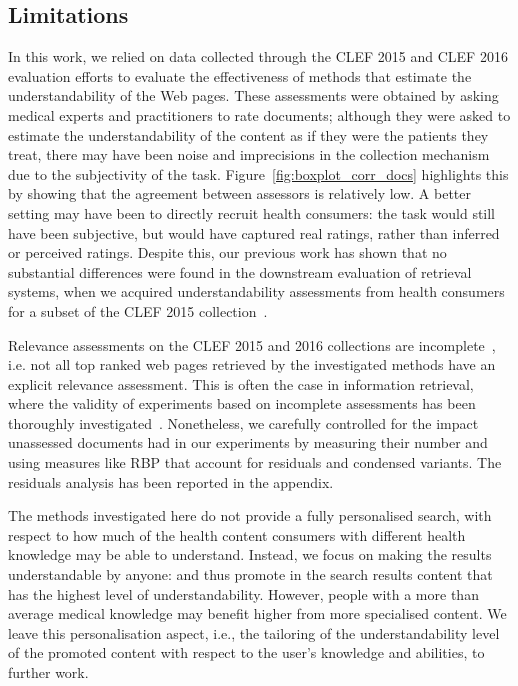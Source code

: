 \documentclass[10pt,a4paper]{article}
\begin{document}
\subsection*{Limitations}
In this work, we relied on data collected through the CLEF 2015 and CLEF 2016 evaluation efforts to evaluate the effectiveness of methods that estimate the understandability of the Web pages. These assessments were obtained by asking medical experts and practitioners to rate documents;  although they were asked to estimate the understandability of the content as if they were the patients they treat, there may have been noise and imprecisions in the collection mechanism due to the subjectivity of the
task. Figure~\ref{fig:boxplot_corr_docs} highlights this by showing that the agreement between assessors is relatively low. A better setting may have been to directly recruit health consumers: the task would still have been subjective, but would have captured real ratings, rather than inferred or perceived ratings. Despite this, our previous work has shown that no substantial differences were found in the downstream evaluation of retrieval systems, when we acquired understandability assessments from health consumers for a subset of the CLEF 2015 collection~\cite{palotti16b}. 

Relevance assessments on the CLEF 2015 and 2016 collections are incomplete~\cite{clef15,clef16}, i.e. not all top ranked web pages retrieved by the investigated methods have an explicit relevance assessment. This is often the case in information retrieval, where the validity of experiments based on incomplete assessments has been thoroughly investigated~\cite{sanderson2010test}. Nonetheless, we carefully controlled for the impact unassessed documents had in our experiments by measuring their number and using measures like RBP that account for residuals and condensed variants. The residuals analysis has been reported in the appendix. 

The methods investigated here do not provide a fully personalised search, with respect to how much of the health content consumers with different health knowledge may be able to understand. Instead, we focus on making the results understandable by anyone: and thus promote in the search results content that has the highest level of understandability. However, people with a more than average medical knowledge may benefit higher from more specialised content. We leave this personalisation aspect, i.e., the tailoring of the understandability level of the promoted content with respect to the user's knowledge and abilities, to further work.
\end{document}
